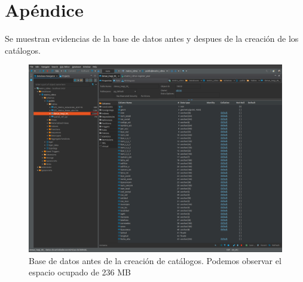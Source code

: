 \documentclass{article}
\begin{document}
\section*{Apéndice}
Se muestran evidencias de la base de datos antes y despues de la creación de los
catálogos.

\pagebreak
\begin{landscape}
\begin{figure}[h!]
    \includegraphics[width=18cm]{figures/bd_original.png}
    \caption{Base de datos antes de la creación de catálogos. Podemos observar
    el espacio ocupado de 236 MB}
    \centering
\end{figure}
\end{landscape}
\end{document}

